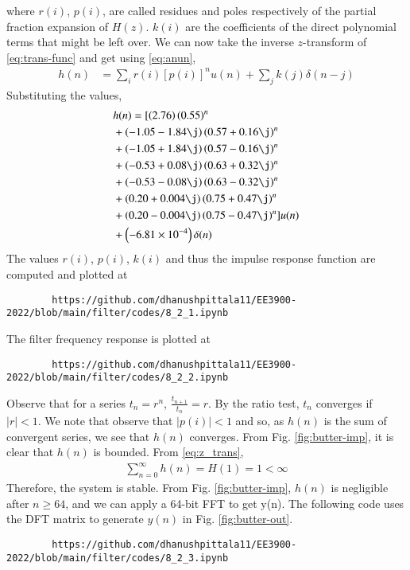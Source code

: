 \documentclass[journal,12pt,twocolumn]{IEEEtran}
\renewcommand\thesection{\arabic{section}}
\begin{document}
\begin{enumerate}[label=\thesection.\arabic*]
	where $r(i)$, $p(i)$, are called residues and poles respectively of the partial 
	fraction expansion of $H(z)$. $k(i)$ are the coefficients of the direct polynomial 
	terms that might be left over. We can now take the inverse $z$-transform of
	\eqref{eq:trans-func} and get using \eqref{eq:anun},
	\begin{align}
		h(n) &= \sum_{i}r(i)[p(i)]^nu(n) + \sum_{j}k(j)\delta(n - j)
		\label{eq:h-n-expr}
	\end{align}
	Substituting the values,
	\begin{align}
		&h(n) = [\brak{2.76}\brak{0.55}^n \nonumber \\ 
		&+ \brak{-1.05-1.84\j}\brak{0.57+0.16\j}^n \nonumber \\
		&+ \brak{-1.05+1.84\j}\brak{0.57-0.16\j}^n \nonumber \\
		&+ \brak{-0.53+0.08\j}\brak{0.63+0.32\j}^n \nonumber \\
		&+ \brak{-0.53-0.08\j}\brak{0.63-0.32\j}^n \nonumber \\
		&+ \brak{0.20+0.004\j}\brak{0.75+0.47\j}^n \nonumber \\
		&+ \brak{0.20-0.004\j}\brak{0.75-0.47\j}^n]u(n) \nonumber \\
		&+ \brak{-6.81 \times 10^{-4}}\delta(n)
	\end{align}
	The values $r(i)$, $p(i)$, $k(i)$ and thus the impulse response function are computed and plotted at
	\begin{lstlisting}
		https://github.com/dhanushpittala11/EE3900-2022/blob/main/filter/codes/8_2_1.ipynb
	\end{lstlisting}
	The filter frequency response is plotted at
	\begin{lstlisting}
		https://github.com/dhanushpittala11/EE3900-2022/blob/main/filter/codes/8_2_2.ipynb
	\end{lstlisting}
	Observe that for a series $t_n = r^n$, $\frac{t_{n + 1}}{t_n} = r$.
	By the ratio test, $t_n$ converges if $|r| < 1$. We note that
	observe that $|p(i)| < 1$ and so, as $h(n)$ is the sum of convergent series,
	we see that $h(n)$ converges. From Fig. \eqref{fig:butter-imp}, it is clear
	that $h(n)$ is bounded. From \eqref{eq:z_trans},
	\begin{align}
		\sum_{n = 0}^{\infty}h(n) = H(1) = 1 < \infty
	\end{align}
	Therefore, the system is stable. From
	Fig. \eqref{fig:butter-imp}, $h(n)$ is negligible after $n \geq 64$, and we
	can apply a 64-bit FFT to get y(n). The following code uses the DFT matrix
	to generate $y(n)$ in Fig. \eqref{fig:butter-out}.
	\begin{lstlisting}
		https://github.com/dhanushpittala11/EE3900-2022/blob/main/filter/codes/8_2_3.ipynb
	\end{lstlisting}
	

\end{enumerate}
\end{document}
